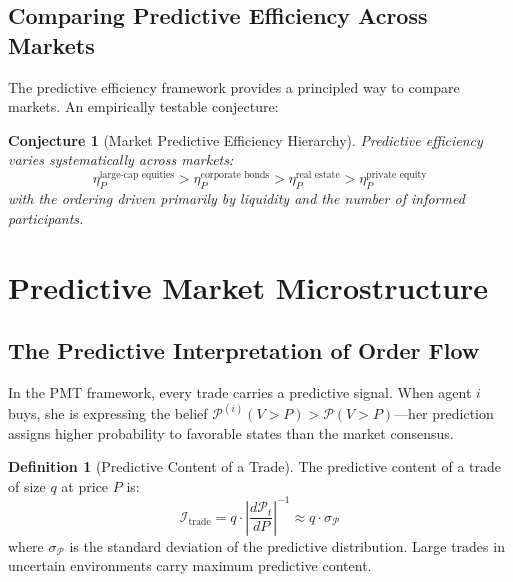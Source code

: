 \documentclass[12pt,a4paper]{article}
\newtheorem{conjecture}[theorem]{Conjecture}
\theoremstyle{definition}
\newtheorem{definition}[theorem]{Definition}
\newcommand{\PP}{\mathcal{P}}
\begin{document}
\subsection{Comparing Predictive Efficiency Across Markets}

The predictive efficiency framework provides a principled way to compare markets. An empirically testable conjecture:

\begin{conjecture}[Market Predictive Efficiency Hierarchy]\label{conj:hierarchy}
Predictive efficiency varies systematically across markets:
\begin{equation}
    \eta_P^{\text{large-cap equities}} > \eta_P^{\text{corporate bonds}} > \eta_P^{\text{real estate}} > \eta_P^{\text{private equity}}
\end{equation}
with the ordering driven primarily by liquidity and the number of informed participants.
\end{conjecture}



\section{Predictive Market Microstructure}\label{sec:microstructure}

\subsection{The Predictive Interpretation of Order Flow}

In the PMT framework, every trade carries a predictive signal. When agent $i$ buys, she is expressing the belief $\PP^{(i)}(V > P) > \PP(V > P)$---her prediction assigns higher probability to favorable states than the market consensus.

\begin{definition}[Predictive Content of a Trade]\label{def:trade_content}
The predictive content of a trade of size $q$ at price $P$ is:
\begin{equation}\label{eq:trade_content}
    \mathcal{I}_{\text{trade}} = q \cdot \left|\frac{d\PP_t}{dP}\right|^{-1} \approx q \cdot \sigma_{\PP}
\end{equation}
where $\sigma_\PP$ is the standard deviation of the predictive distribution. Large trades in uncertain environments carry maximum predictive content.
\end{definition}
\end{document}

